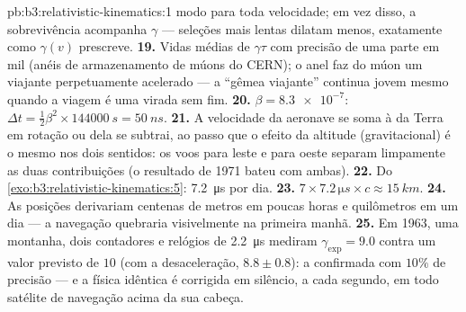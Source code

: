 \begin{solution}{pb:b3:relativistic-kinematics:1}
modo para toda velocidade; em vez disso, a sobrevivência acompanha
$\gamma$ --- seleções mais lentas dilatam menos, exatamente como
$\gamma(v)$ prescreve.
\textbf{19.} Vidas médias de $\gamma\tau$ com precisão de uma parte em
mil (anéis de armazenamento de múons do CERN); o anel faz do múon um
viajante perpetuamente acelerado --- a ``gêmea viajante'' continua
jovem mesmo quando a viagem é uma virada sem fim.
\textbf{20.} $\beta = \num{8.3e-7}$: $\Delta t = \tfrac12\beta^2
\times \qty{144000}{s} = \qty{50}{ns}$.
\textbf{21.} A velocidade da aeronave se soma à da Terra em rotação ou
dela se subtrai, ao passo que o efeito da altitude (gravitacional) é o
mesmo nos dois sentidos: os voos para leste e para oeste separam
limpamente as duas contribuições (o resultado de 1971 bateu com
ambas).
\textbf{22.} Do \cref{exo:b3:relativistic-kinematics:5}:
\qty{7.2}{\micro s} por dia.
\textbf{23.} $7 \times 7.2\,\unit{\micro s} \times c \approx
\qty{15}{km}.$
\textbf{24.} As posições derivariam centenas de metros em poucas horas
e quilômetros em um dia --- a navegação quebraria visivelmente na
primeira manhã.
\textbf{25.} Em 1963, uma montanha, dois contadores e relógios de
\qty{2.2}{\micro s} mediram $\gamma_{\exp} = 9.0$ contra um valor
previsto de $10$ (com a desaceleração, $8.8 \pm 0.8$): a  confirmada com $10\%$ de precisão --- e a física idêntica é
corrigida em silêncio, a cada segundo, em todo satélite de navegação
acima da sua cabeça.
\end{solution}
